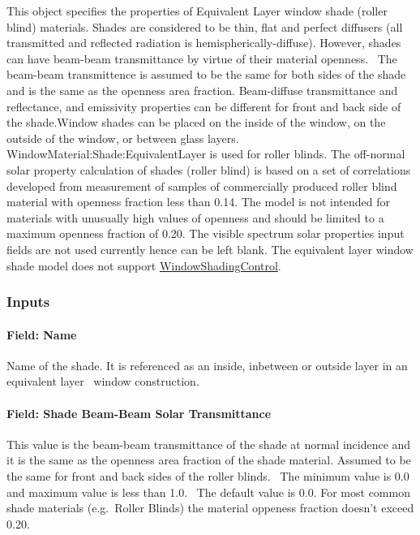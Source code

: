 This object specifies the properties of Equivalent Layer window shade (roller blind) materials. Shades are considered to be thin, flat and perfect diffusers (all transmitted and reflected radiation is hemispherically-diffuse). However, shades can have beam-beam transmittance by virtue of their material openness.~ The beam-beam transmittence is assumed to be the same for both sides of the shade and is the same as the openness area fraction. Beam-diffuse transmittance and reflectance, and emissivity properties can be different for front and back side of the shade.Window shades can be placed on the inside of the window, on the outside of the window, or between glass layers. WindowMaterial:Shade:EquivalentLayer is used for roller blinds. The off-normal solar property calculation of shades (roller blind) is based on a set of correlations developed from measurement of samples of commercially produced roller blind material with openness fraction less than 0.14. The model is not intended for materials with unusually high values of openness and should be limited to a maximum openness fraction of 0.20. The visible spectrum solar properties input fields are not used currently hence can be left blank. The equivalent layer window shade model does not support \hyperref[windowpropertyshadingcontrol]{WindowShadingControl}.

\subsubsection{Inputs}\label{inputs-26-002}

\paragraph{Field: Name}\label{field-name-20-003}

Name of the shade. It is referenced as an inside, inbetween or outside layer in an equivalent layer~ window construction.

\paragraph{Field: Shade Beam-Beam Solar Transmittance}\label{field-shade-beam-beam-solar-transmittance}

This value is the beam-beam transmittance of the shade at normal incidence and it is the same as the openness area fraction of the shade material. Assumed to be the same for front and back sides of the roller blinds.~ The minimum value is 0.0 and maximum value is less than 1.0.~ The default value is 0.0. For most common shade materials (e.g.~Roller Blinds) the material oppeness fraction doesn't exceed 0.20.

